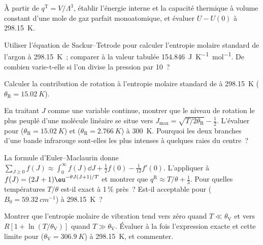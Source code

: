 \begin{exercise}[$\star\star$]\label{exo:b3:partition-functions:7}
À partir de $q^{\mathrm T} = V/\Lambda^3$, établir l'énergie interne et la
capacité thermique à volume constant d'une mole de gaz parfait
monoatomique, et évaluer $U - U(0)$ à
\qty{298.15}{K}.
\end{exercise}

\begin{exercise}[$\star\star$]\label{exo:b3:partition-functions:8}
Utiliser l'équation de Sackur--Tetrode pour calculer l'entropie molaire
standard de l'argon à \qty{298.15}{K}~; comparer à la valeur tabulée
\qty{154.846}{J.K^{-1}.mol^{-1}}. De combien varie-t-elle si l'on divise
la pression par 10~?
\end{exercise}

\begin{exercise}[$\star\star$]\label{exo:b3:partition-functions:9}
Calculer la contribution de rotation à l'entropie molaire standard de
 à \qty{298.15}{K} ($\theta_{\mathrm R} = \qty{15.02}{K}$).
\end{exercise}

\begin{exercise}[$\star\star\star$]\label{exo:b3:partition-functions:10}
En traitant $J$ comme une variable continue, montrer que le niveau de
rotation le plus peuplé d'une molécule linéaire se situe vers
$J_{\max} = \sqrt{T/2\theta_{\mathrm R}} - \frac12$. L'évaluer pour 
($\theta_{\mathrm R} = \qty{15.02}{K}$) et  ($\theta_{\mathrm R} = \qty{2.766}{K}$)
à \qty{300}{K}. Pourquoi les deux
branches d'une bande infrarouge sont-elles les plus intenses à quelques
raies du centre~?
\end{exercise}

\begin{exercise}[$\star\star\star$]\label{exo:b3:partition-functions:11}
La formule d'Euler--Maclaurin donne $\sum_{J\ge0}f(J) \approx \int_0^\infty f(J)\dd J + \frac12f(0) -
\frac1{12}f'(0)$. L'appliquer à $f(J) = (2J+1)\eu^{-\theta J(J+1)/T}$ et
montrer que $q^{\mathrm R} \approx T/\theta +
\frac13$. Pour quelles températures $T/\theta$ est-il exact à 1\,\% près~?
Est-il acceptable pour 
($B_0 = \qty{59.32}{cm^{-1}}$) à \qty{298.15}{K}~?
\end{exercise}

\begin{exercise}[$\star\star\star$]\label{exo:b3:partition-functions:12}
Montrer que l'entropie molaire de vibration tend vers zéro quand
$T \ll \theta_{\mathrm V}$ et vers
$R[1 + \ln(T/\theta_{\mathrm V})]$ quand $T \gg \theta_{\mathrm V}$.
Évaluer à la fois l'expression exacte et cette limite pour 
($\theta_{\mathrm V} = \qty{306.9}{K}$) à \qty{298.15}{K}, et commenter.
\end{exercise}

